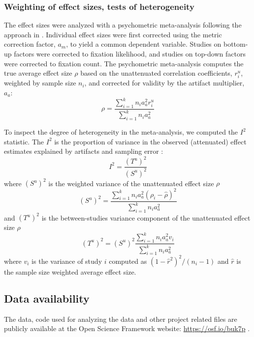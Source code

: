 \documentclass[english,natbib,man,floatsintext]{apa6}
\begin{document}
\subsubsection{Weighting of effect sizes, tests of heterogeneity}

The effect sizes were analyzed with a psychometric meta-analysis following the approach in \cite{hunter2004a}. Individual effect sizes were first corrected using the metric correction factor, $a_m$, to yield a common dependent variable. Studies on bottom-up factors were corrected to fixation likelihood, and studies on top-down factors were corrected to fixation count. The psychometric meta-analysis computes the true average effect size $\rho$ based on the unattenuated correlation coefficients, $r_i^u$, weighted by sample size $n_i$, and corrected for validity by the artifact multiplier, $a_a$: 
%
\begin{equation}
\label{eq:psychometric_rho}
\rho = \frac{\sum_{i=1}^k n_i a_a^2 r_i^u}{\sum_{i=1}^k n_i a_a^2}
\end{equation}

To inspect the degree of heterogeneity in the meta-analysis, we computed the $I^2$ statistic. The $I^2$ is the proportion of variance in the observed (attenuated) effect estimates explained by artifacts and sampling error \citep{borenstein2011introduction}: 
%
\begin{equation}
\label{eq:i2_statistic}
I^2 = \frac{(T^u)^2}{(S^u)^2}
\end{equation}
%
where $(S^u)^2$ is the weighted variance of the unattenuated effect size $\rho$
%
\begin{equation}
\label{eq:Su2_var}
(S^u)^2 = \frac{\sum_{i=1}^k n_i a_a^2 (\rho_i - \hat{\rho})^2}{\sum_{i=1}^k n_i a_a^2}
\end{equation}
%
and $(T^u)^2$ is the between-studies variance component of the unattenuated effect size $\rho$
%
\begin{equation}
\label{eq:Tu2_var}
(T^u)^2 = (S^u)^2 \frac{\sum_{i=1}^k n_i a_a^2 v_i}{\sum_{i=1}^k n_i a_a^2}
\end{equation}
%
where $v_i$ is the variance of study $i$ computed as $(1 - \hat{r}^2)^2 / (n_i - 1)$ and $\hat{r}$ is the sample size weighted average effect size.


\subsection{Data availability}

The data, code used for analyzing the data and other project related files are publicly available at the Open Science Framework website: \url{https://osf.io/buk7p} \citep{orquin2020osfa}.
\end{document}
